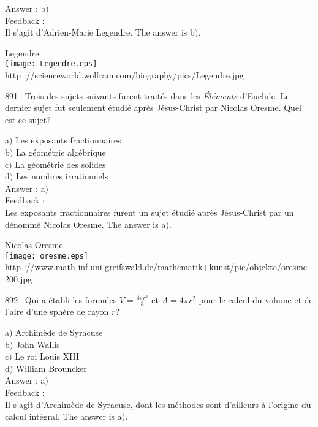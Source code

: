﻿\documentclass[letterpaper, 12pt]{article}
\begin{document}
Answer : b$)$\\

Feedback : \\
Il s'agit d'Adrien-Marie Legendre. The answer is b$)$.

        \begin{center}
        Legendre\\
    \texttt{[image: Legendre.eps]}\\
        {\footnotesize http
://scienceworld.wolfram.com/biography/pics/Legendre.jpg}
    \end{center}

891-- Trois des sujets suivants furent trait\'es dans les {\sl
\'El\'ements} d'Euclide. Le dernier sujet fut seulement \'etudi\'e
apr\`es J\'esus-Christ par Nicolas Oresme. Quel est ce sujet?

a$)$ Les exposants fractionnaires \\
b$)$ La g\'eom\'etrie alg\'ebrique \\
c$)$ La g\'eom\'etrie des solides \\
d$)$ Les nombres irrationnels\\

Answer : a$)$\\

Feedback : \\
Les exposants fractionnaires furent un sujet \'etudi\'e apr\`es
J\'esus-Christ par un d\'enomm\'e Nicolas Oresme. The answer is a$)$.\\

        \begin{center}
        Nicolas Oresme\\
    \texttt{[image: oresme.eps]}\\
        {\footnotesize http
://www.math-inf.uni-greifswald.de/mathematik+kunst/pic/objekte/oresme-200.jpg}
    \end{center}

892-- Qui a \'etabli les formules $V=\frac{4\pi r^3}3$ et $A=4\pi
r^2$ pour le calcul du volume et de l'aire d'une sph\`ere de rayon
$r$?

a$)$ Archim\`ede de Syracuse \\
b$)$ John Wallis \\
c$)$ Le roi Louis XIII \\
d$)$ William Brouncker\\

Answer : a$)$\\

Feedback : \\
Il s'agit d'Archim\`ede de Syracuse, dont les m\'ethodes sont d'ailleurs \`a
l'origine du calcul int\'egral. The answer is a$)$.\\
\end{document}
